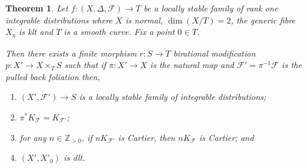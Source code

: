 \documentclass[12pt, a4paper]{amsart}
\newcounter{Theorem}
\newtheorem{theorem}{Theorem}[section]
\theoremstyle{definition}
\theoremstyle{named}
\begin{document}
    

\begin{theorem}
\label{thm_dlt_mod_fam}
       Let $f\colon (X, \Delta, \mathcal F) \rightarrow T$
    be a locally stable family of rank one integrable distributions where $X$ is normal,  $\dim (X/T) = 2$, the generic fibre $X_\eta$ is klt and $T$ is a smooth curve. Fix a point $0 \in T$.  


    Then there exists a finite morphism $r\colon S \rightarrow T$ birational modification $p\colon X' \rightarrow X\times_TS$
    such that if $\pi\colon X' \rightarrow X$ is the natural map and 
    $\mathcal F' = \pi^{-1}\mathcal F$
is the pulled back foliation then,     \begin{enumerate}
\item $(X', \mathcal F') \rightarrow S$ is a locally stable family of integrable distributions;
        \item $\pi^*K_{\mathcal F} = K_{\mathcal F'}$;
        \item for any $n \in \mathbb Z_{>0}$, if $nK_{\mathcal F'}$ is Cartier, then $nK_{\mathcal F}$ is Cartier; and 
        \item $(X', X'_0)$ is dlt.
    \end{enumerate}
\end{theorem}
\end{document}
